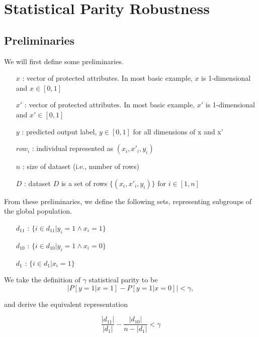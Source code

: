 
\section{Statistical Parity Robustness}

\subsection{Preliminaries}
We will first define some preliminaries.
\begin{itemize}[label={}, itemsep=-1em]
\item[$x$]: vector of protected attributes. In most basic example, $x$ is 1-dimensional and $x \in [0, 1]$\\
\item[$x'$]: vector of protected attributes. In most basic example, $x'$ is 1-dimensional and $x' \in [0, 1]$\\
\item[$y$]: predicted output label, $y \in [0, 1]$ for all dimensions of x and x'\\
\item[$row_i$]: individual represented as $(x_i, x'_i, y_i)$\\
\item[$n$]: size of dataset (i.e., number of rows)\\
\item[$D$]: dataset $D$ is a set of rows $\{ (x_i, x'_i, y_i) \}$ for $i \in [1, n]$\\
\end{itemize}

From these preliminaries, we define the following sets, representing subgroups of the global population.
\begin{itemize}[label={}, itemsep=-1em]
\item[$d_{11}$]: $\{ i \in d_{11} | y_i = 1 \land x_i = 1 \}$\\
\item[$d_{10}$]: $\{ i \in d_{10} | y_i = 1 \land x_i = 0 \}$\\
\item[$d_{1}$]: $\{ i \in d_{1} | x_i = 1 \}$\\
\end{itemize}

We take the definition of $\gamma$ statistical parity to be
\[
\left| P[ y = 1 | x = 1] - P[ y = 1 | x = 0] \right| < \gamma,
\]

and derive the equivalent representation 

\[
\frac{\left| d_{11} \right|}{\left| d_1 \right|} - \frac{\left| d_{10} \right|}{n - \left| d_1 \right|} < \gamma
\]